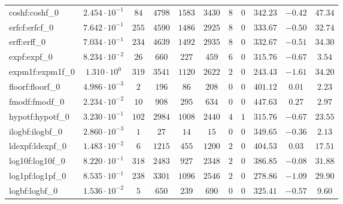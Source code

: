\begin{tabular}{|l|c|c|c|c|c|c|c|c|c|c|}
coshf:coshf\_0               & $ 2.454 \cdot 10^{-1} $ & $ 84     $ & $ 4798  $ & $ 1583  $ & $ 3430  $ & $ 8   $ & $ 0 $ & $ 342.23      $ & $ -0.42   $ & $ 47.34   $ \\
erfcf:erfcf\_0               & $ 7.642 \cdot 10^{-1} $ & $ 255    $ & $ 4590  $ & $ 1486  $ & $ 2925  $ & $ 8   $ & $ 0 $ & $ 333.67      $ & $ -0.50   $ & $ 32.74   $ \\
erff:erff\_0                 & $ 7.034 \cdot 10^{-1} $ & $ 234    $ & $ 4639  $ & $ 1492  $ & $ 2935  $ & $ 8   $ & $ 0 $ & $ 332.67      $ & $ -0.51   $ & $ 34.30   $ \\
expf:expf\_0                 & $ 8.234 \cdot 10^{-2} $ & $ 26     $ & $ 660   $ & $ 227   $ & $ 459   $ & $ 6   $ & $ 0 $ & $ 315.76      $ & $ -0.67   $ & $ 3.54    $ \\
expm1f:expm1f\_0             & $ 1.310 \cdot 10^{0}  $ & $ 319    $ & $ 3541  $ & $ 1120  $ & $ 2622  $ & $ 2   $ & $ 0 $ & $ 243.43      $ & $ -1.61   $ & $ 34.20   $ \\
floorf:floorf\_0             & $ 4.986 \cdot 10^{-3} $ & $ 2      $ & $ 196   $ & $ 86    $ & $ 208   $ & $ 0   $ & $ 0 $ & $ 401.12      $ & $ 0.01    $ & $ 2.23    $ \\
fmodf:fmodf\_0               & $ 2.234 \cdot 10^{-2} $ & $ 10     $ & $ 908   $ & $ 295   $ & $ 634   $ & $ 0   $ & $ 0 $ & $ 447.63      $ & $ 0.27    $ & $ 2.97    $ \\
hypotf:hypotf\_0             & $ 3.230 \cdot 10^{-1} $ & $ 102    $ & $ 2984  $ & $ 1008  $ & $ 2440  $ & $ 4   $ & $ 1 $ & $ 315.76      $ & $ -0.67   $ & $ 23.55   $ \\
ilogbf:ilogbf\_0             & $ 2.860 \cdot 10^{-3} $ & $ 1      $ & $ 27    $ & $ 14    $ & $ 15    $ & $ 0   $ & $ 0 $ & $ 349.65      $ & $ -0.36   $ & $ 2.13    $ \\
ldexpf:ldexpf\_0             & $ 1.483 \cdot 10^{-2} $ & $ 6      $ & $ 1215  $ & $ 455   $ & $ 1200  $ & $ 2   $ & $ 0 $ & $ 404.53      $ & $ 0.03    $ & $ 17.51   $ \\
log10f:log10f\_0             & $ 8.220 \cdot 10^{-1} $ & $ 318    $ & $ 2483  $ & $ 927   $ & $ 2348  $ & $ 2   $ & $ 0 $ & $ 386.85      $ & $ -0.08   $ & $ 31.88   $ \\
log1pf:log1pf\_0             & $ 8.535 \cdot 10^{-1} $ & $ 238    $ & $ 3301  $ & $ 1096  $ & $ 2546  $ & $ 2   $ & $ 0 $ & $ 278.86      $ & $ -1.09   $ & $ 29.90   $ \\
logbf:logbf\_0               & $ 1.536 \cdot 10^{-2} $ & $ 5      $ & $ 650   $ & $ 239   $ & $ 690   $ & $ 0   $ & $ 0 $ & $ 325.41      $ & $ -0.57   $ & $ 9.60    $ \\

\end{tabular}
